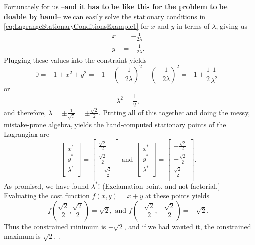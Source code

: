 Fortunately for us --\textbf{and it has to be like this for the problem to be doable by hand}-- we can easily solve the stationary conditions in \eqref{eq:LagrangeStationaryConditionsExample1} for $x$ and $y$ in terms of $\lambda$, giving us
\begin{align*}
    x &= - \frac{1}{2 \lambda} \\
    y &= - \frac{1}{2 \lambda}.
\end{align*}
Plugging these values into the constraint yields
$$0=-1 + x^2 + y^2 = -1 + \left(  - \frac{1}{2 \lambda}\right)^2  + \left(  - \frac{1}{2 \lambda}\right)^2 = -1 + \frac{1}{2} \frac{1}{\lambda^2},$$
or
$$\lambda^2 = \frac{1}{2}, $$
and therefore, $\lambda = \pm \frac{1}{\sqrt{2}} = \pm \frac{\sqrt{2}}{2}$. Putting all of this together and doing the messy, mistake-prone algebra, yields the hand-computed stationary points of the Lagrangian are
$$\left[\begin{array}{c}
x^\ast\\
y^\ast\\
\lambda^\ast \\
\end{array} \right] = \left[\begin{array}{r}
\frac{\sqrt{2}}{2}\\
\frac{\sqrt{2}}{2}\\
-\frac{\sqrt{2}}{2} \\
\end{array} \right] \text{ and } \left[\begin{array}{c}
x^\ast\\
y^\ast \\
\lambda^\ast \\
\end{array} \right] = \left[\begin{array}{r}
-\frac{\sqrt{2}}{2}\\
-\frac{\sqrt{2}}{2}\\
\frac{\sqrt{2}}{2} \\
\end{array} \right].$$
As promised, we have found $\lambda^\ast$! (Exclamation point, and not factorial.)\\

Evaluating the cost function \( f(x,y) = x+y \) at these points yields
$$f\left(\frac{\sqrt{2}}{2}, \frac{\sqrt{2}}{2}\right) = \sqrt{2}, \text{ and }  f\left(-\frac{\sqrt{2}}{2}, -\frac{\sqrt{2}}{2} \right) = -\sqrt{2}. $$
Thus the constrained minimum is \( -\sqrt{2} \), and if we had wanted it, the constrained maximum is \( \sqrt{2} \).
\Qed. 

